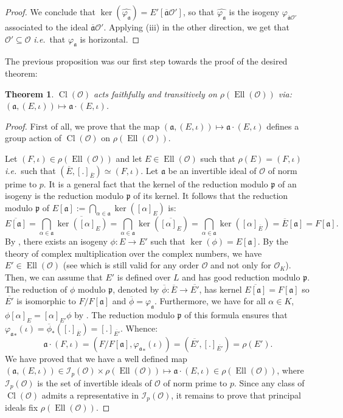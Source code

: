 \documentclass[a4paper,10pt,notitlepage]{report}
\theoremstyle{definition}
\theoremstyle{plain}
\newtheorem{Theorem}[Definition]{Theorem}
\theoremstyle{definition}
\newcommand{\ie}{\emph{i.e.}\ }
\newcommand{\mO}{\mathcal{O}}
\renewcommand{\(}{\left(}
\renewcommand{\)}{\right)}
\newcommand{\mf}[1]{\mathfrak{#1}}
\newcommand{\mfp}{\mathfrak{p}}
\DeclareMathOperator{\Cl}{Cl}
\DeclareMathOperator{\Ell}{Ell}
\begin{document}
\begin{proof}
We conclude that $\ker(\widehat{\varphi_{\mf{a}}})=E'[\overline{\mf{a}}\mO']$, so that $\widehat{\varphi_{\mf{a}}}$ is the isogeny $\varphi_{\overline{\mf{a}}\mO'}$ associated to the ideal $\overline{\mf{a}}\mO'$. Applying (iii) in the other direction, we get that $\mO'\subseteq\mO$ \ie that $\varphi_{\mf{a}}$ is horizontal.
\end{proof}

The previous proposition was our first step towards the proof of the desired theorem:

\begin{Theorem}\label{Theorem 3}
$\Cl(\mO)$ acts faithfully and transitively on $\rho(\Ell(\mO))$ via: $(\mf{a},(E,\iota))\longmapsto \mf{a}\cdot (E,\iota)$.
\end{Theorem}

\begin{proof}
First of all, we prove that the map $(\mf{a},(E,\iota))\longmapsto \mf{a}\cdot (E,\iota)$ defines a group action of $\Cl(\mO)$ on $\rho(\Ell(\mO))$. 

Let $(F,\iota)\in \rho(\Ell(\mO))$ and let $E\in\Ell(\mO)$ such that $\rho(E)=(F,\iota)$ \ie such that $(\overline{E},[.]_{\overline{E}})\simeq (F,\iota)$.  Let $\mf{a}$ be an invertible ideal of $\mO$ of norm prime to $p$. It is a general fact that the kernel of the reduction modulo $\mfp$ of an isogeny is the reduction modulo $\mfp$ of its kernel. It follows that the reduction modulo $\mfp$ of $E[\mf{a}]:=\bigcap_{\alpha\in\mf{a}}\ker([\alpha]_E)$ is:
\[\overline{E[\mf{a}]}=\bigcap_{\alpha\in\mf{a}}\overline{\ker([\alpha]_E)}=\bigcap_{\alpha\in\mf{a}}\ker(\overline{[\alpha]_E})=\bigcap_{\alpha\in\mf{a}}\ker([\alpha]_{\overline{E}})=\overline{E}[\mf{a}]=F[\mf{a}].\]
By \cite[Proposition III.4.12]{Silverman1}, there exists an isogeny $\phi : E\longrightarrow E'$ such that $\ker(\phi)=E[\mf{a}]$. By the theory of complex multiplication over the complex numbers,  we have $E'\in\Ell(\mO)$ (see \cite[Proposition II.2.1.(a).(ii)]{Silverman2} which is still valid for any order $\mO$ and not only for $\mO_K$). Then, we can assume that $E'$ is defined over $L$ and has good reduction modulo $\mfp$. The reduction of $\phi$ modulo $\mfp$, denoted by $\overline{\phi}:\overline{E}\longrightarrow\overline{E'}$, has kernel $\overline{E[\mf{a}]}=F[\mf{a}]$ so $\overline{E'}$ is isomorphic to $F/F[\mf{a}]$ and $\overline{\phi}=\varphi_{\mf{a}}$. Furthermore, we have for all $\alpha\in K$, $\phi[\alpha]_E=[\alpha]_{E'}\phi$ by \cite[Corollary II.1.1.1]{Silverman2}. The reduction modulo $\mfp$ of this formula ensures that ${\varphi_{\mf{a}}}_*(\iota)=\overline{\phi}_*([.]_{\overline{E}})=[.]_{\overline{E'}}$. Whence: 
\[\mf{a}\cdot(F,\iota)=(F/F[\mf{a}],{\varphi_{\mf{a}}}_*(\iota))=(\overline{E'},[.]_{\overline{E'}})=\rho(E').\]
We have proved that we have a well defined map $(\mf{a},(E,\iota))\in\mathcal{I}_p(\mO)\times\rho(\Ell(\mO))\longmapsto \mf{a}\cdot (E,\iota)\in\rho(\Ell(\mO))$, where $\mathcal{I}_p(\mO)$ is the set of invertible ideals of $\mO$ of norm prime to $p$. Since any class of $\Cl(\mO)$ admits a representative in $\mathcal{I}_p(\mO)$, it remains to prove that principal ideals fix $\rho(\Ell(\mO))$. 


\end{proof}
\end{document}
